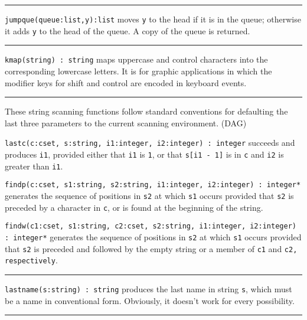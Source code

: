 \vspace{0.25cm}\hrule{}

\texttt{jumpque(}\texttt{queue}\texttt{:list,y):list} moves
\texttt{y} to the head if it is in the queue; otherwise it adds
\texttt{y} to the head of the queue. A copy of the queue is returned.


\vspace{0.25cm}\hrule{}

\texttt{kmap(string) : string} maps uppercase and control
characters into the corresponding
lowercase letters. It is for graphic applications in which the modifier
keys for shift and control are encoded in keyboard
events. 

\vspace{0.25cm}\hrule{}

These string scanning functions follow standard conventions for
defaulting the last three parameters to the current scanning
environment. (DAG)

\texttt{lastc(c:cset, s:string, i1:integer, i2:integer) : integer}
succeeds and produces \texttt{i1}, provided either that \texttt{i1} is
\texttt{1}, or that \texttt{s[i1 - 1]} is in \texttt{c} and \texttt{i2}
is greater than \texttt{i1}.

\texttt{findp(c:cset, s1:string, s2:string, i1:integer, i2:integer) :
integer*} generates the sequence of positions in \texttt{s2} at which
\texttt{s1} occurs provided that \texttt{s2} is preceded by a character
in \texttt{c}, or is found at the beginning of the string.

\texttt{findw(c1:cset, s1:string, c2:cset, s2:string, i1:integer,
i2:integer) : integer*} generates the sequence of positions in
\texttt{s2} at which \texttt{s1} occurs provided that \texttt{s2} is
preceded and followed by the empty string or a member of \texttt{c1}
and \texttt{c2, respectively}.

\vspace{0.25cm}\hrule{}

\texttt{lastname(s:string) : string} produces the last name in string
\texttt{s}, which must be a name in conventional form. Obviously, it
doesn't work for every possibility. 

\vspace{0.25cm}\hrule{}

